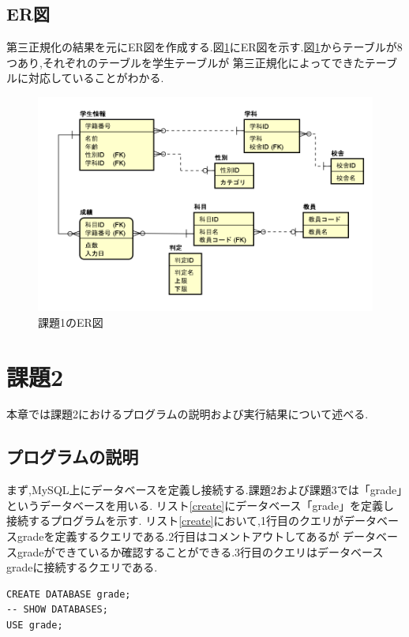 \documentclass[a4j]{jarticle}
\begin{document}
    \subsection{ER図}
    第三正規化の結果を元にER図を作成する.図\ref{oneER}にER図を示す.図\ref{oneER}からテーブルが8つあり,それぞれのテーブルを学生テーブルが
    第三正規化によってできたテーブルに対応していることがわかる.
    \begin{figure}[H]
      \centering
      \includegraphics[scale=0.8]{oneER.png}
      \caption{課題1のER図}
       \label{oneER}
      \end{figure}

    \section{課題2}
    本章では課題2におけるプログラムの説明および実行結果について述べる.
    \subsection{プログラムの説明}
    まず,MySQL上にデータベースを定義し接続する.課題2および課題3では「grade」というデータベースを用いる.
    リスト\ref{create}にデータベース「grade」を定義し接続するプログラムを示す.
    リスト\ref{create}において,1行目のクエリがデータベースgradeを定義するクエリである.2行目はコメントアウトしてあるが
    データベースgradeができているか確認することができる.3行目のクエリはデータベースgradeに接続するクエリである.
    \begin{lstlisting}[basicstyle=\ttfamily\footnotesize, frame=single,label=create,caption=データベースの定義および接続]
CREATE DATABASE grade;
-- SHOW DATABASES;
USE grade;
    \end{lstlisting}
\end{document}
